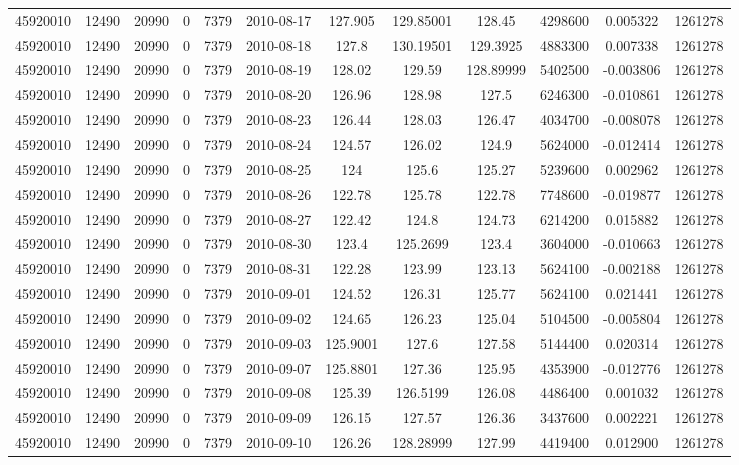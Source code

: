 \documentclass[12 pt]{article}
\begin{document}
\begin{flushleft}
\begin{table}[h]
\begin{tabular}{c c c c c c c c c c c c }
45920010 & 12490 & 20990 & 0 & 7379 & 2010-08-17 & 127.905 & 129.85001 & 128.45 & 4298600 & 0.005322 & 1261278\\
45920010 & 12490 & 20990 & 0 & 7379 & 2010-08-18 & 127.8 & 130.19501 & 129.3925 & 4883300 & 0.007338 & 1261278\\
45920010 & 12490 & 20990 & 0 & 7379 & 2010-08-19 & 128.02 & 129.59 & 128.89999 & 5402500 & -0.003806 & 1261278\\
45920010 & 12490 & 20990 & 0 & 7379 & 2010-08-20 & 126.96 & 128.98 & 127.5 & 6246300 & -0.010861 & 1261278\\
45920010 & 12490 & 20990 & 0 & 7379 & 2010-08-23 & 126.44 & 128.03 & 126.47 & 4034700 & -0.008078 & 1261278\\
45920010 & 12490 & 20990 & 0 & 7379 & 2010-08-24 & 124.57 & 126.02 & 124.9 & 5624000 & -0.012414 & 1261278\\
45920010 & 12490 & 20990 & 0 & 7379 & 2010-08-25 & 124 & 125.6 & 125.27 & 5239600 & 0.002962 & 1261278\\
45920010 & 12490 & 20990 & 0 & 7379 & 2010-08-26 & 122.78 & 125.78 & 122.78 & 7748600 & -0.019877 & 1261278\\
45920010 & 12490 & 20990 & 0 & 7379 & 2010-08-27 & 122.42 & 124.8 & 124.73 & 6214200 & 0.015882 & 1261278\\
45920010 & 12490 & 20990 & 0 & 7379 & 2010-08-30 & 123.4 & 125.2699 & 123.4 & 3604000 & -0.010663 & 1261278\\
45920010 & 12490 & 20990 & 0 & 7379 & 2010-08-31 & 122.28 & 123.99 & 123.13 & 5624100 & -0.002188 & 1261278\\
45920010 & 12490 & 20990 & 0 & 7379 & 2010-09-01 & 124.52 & 126.31 & 125.77 & 5624100 & 0.021441 & 1261278\\
45920010 & 12490 & 20990 & 0 & 7379 & 2010-09-02 & 124.65 & 126.23 & 125.04 & 5104500 & -0.005804 & 1261278\\
45920010 & 12490 & 20990 & 0 & 7379 & 2010-09-03 & 125.9001 & 127.6 & 127.58 & 5144400 & 0.020314 & 1261278\\
45920010 & 12490 & 20990 & 0 & 7379 & 2010-09-07 & 125.8801 & 127.36 & 125.95 & 4353900 & -0.012776 & 1261278\\
45920010 & 12490 & 20990 & 0 & 7379 & 2010-09-08 & 125.39 & 126.5199 & 126.08 & 4486400 & 0.001032 & 1261278\\
45920010 & 12490 & 20990 & 0 & 7379 & 2010-09-09 & 126.15 & 127.57 & 126.36 & 3437600 & 0.002221 & 1261278\\
45920010 & 12490 & 20990 & 0 & 7379 & 2010-09-10 & 126.26 & 128.28999 & 127.99 & 4419400 & 0.012900 & 1261278\\

\end{tabular}
\end{table}
\end{flushleft}
\end{document}

